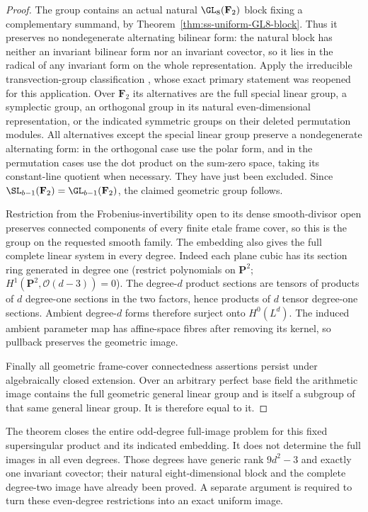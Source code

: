 \begin{proof}
The group contains an actual natural $\GL_8(\mathbf F_2)$ block
fixing a complementary summand, by
Theorem~\ref{thm:ss-uniform-GL8-block}. Thus it preserves no
nondegenerate alternating bilinear form: the natural block has
neither an invariant bilinear form nor an invariant covector,
so it lies in the radical of any invariant form on the whole
representation.
Apply the irreducible transvection-group classification
\cite[Theorem~3.6, printed p.~22]{KantorSeress2001}, whose exact
primary statement was reopened for this application. Over
$\mathbf F_2$ its alternatives are the full special linear
group, a symplectic group, an orthogonal group in its natural
even-dimensional representation, or the indicated symmetric
groups on their deleted permutation modules. All alternatives
except the special linear group preserve a nondegenerate
alternating form: in the orthogonal case use the polar form,
and in the permutation cases use the dot product on the
sum-zero space, taking its constant-line quotient when necessary.
They have just been excluded. Since
$\SL_{b-1}(\mathbf F_2)=\GL_{b-1}(\mathbf F_2)$, the claimed
geometric group follows.

Restriction from the Frobenius-invertibility open to its dense
smooth-divisor open preserves connected components of every finite
etale frame cover, so this is the group on the requested smooth
family. The embedding also gives the full complete linear system
in every degree. Indeed each plane cubic has its section ring
generated in degree one (restrict polynomials on $\mathbf P^2$;
$H^1(\mathbf P^2,\mathcal O(d-3))=0$). The degree-$d$ product
sections are tensors of products of $d$ degree-one sections in
the two factors, hence products of $d$ tensor degree-one sections.
Ambient degree-$d$ forms therefore surject onto $H^0(L^d)$.
The induced ambient parameter map has affine-space fibres after
removing its kernel, so pullback preserves the geometric image.

Finally all geometric frame-cover connectedness assertions persist
under algebraically closed extension. Over an arbitrary perfect
base field the arithmetic image contains the full geometric
general linear group and is itself a subgroup of that same
general linear group. It is therefore equal to it.
\end{proof}

\begin{remark}\label{auto:A_monodromy:d4e480cdd0c6}

The theorem closes the entire odd-degree full-image problem for
this fixed supersingular product and its indicated embedding.
It does not determine the full images in all even degrees.
Those degrees have generic rank $9d^2-3$ and exactly one invariant
covector; their natural eight-dimensional block and the complete
degree-two image have already been proved. A separate argument
is required to turn these even-degree restrictions into an exact
uniform image.
\end{remark}



